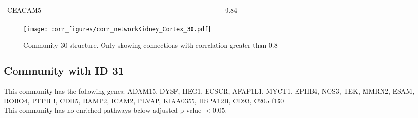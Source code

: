 \begin{longtable}{lrrrrrrrrrrrrrrrrrrrrrrrrrrr}
CEACAM5 &            &             &            &              &             &              &              &              &           &             &             &              &             &             &             &             &            &            &            &            &             &             &             &              &            &               &       0.84 \\
\end{longtable}


\begin{figure}[h!]
\centering
\texttt{[image: corr\_figures/corr\_networkKidney\_Cortex\_30.pdf]}
\caption{Community 30 structure. Only showing connections with correlation greater than 0.8}
\end{figure}




\subsection*{Community with ID 31}
This community has the following genes: ADAM15, DYSF, HEG1, ECSCR, AFAP1L1, MYCT1, EPHB4, NOS3, TEK, MMRN2, ESAM, ROBO4, PTPRB, CDH5, RAMP2, ICAM2, PLVAP, KIAA0355, HSPA12B, CD93, C20orf160
\\
This community has no enriched pathways below adjusted p-value $< 0.05$.

